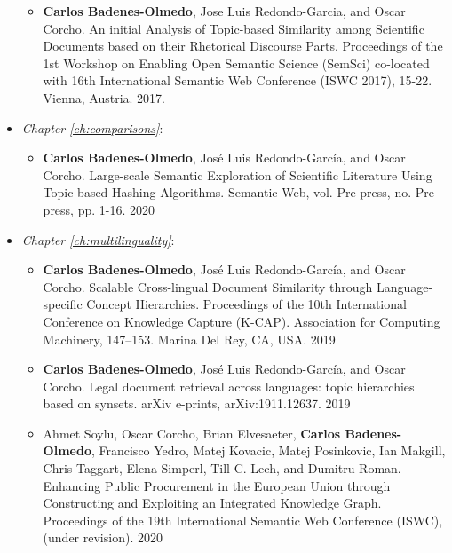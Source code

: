 \begin{itemize}
\begin{itemize}
\item \textbf{Carlos Badenes-Olmedo}, Jose Luis Redondo-Garcia, and Oscar Corcho. An initial Analysis of Topic-based Similarity among Scientific Documents based on their Rhetorical Discourse Parts. Proceedings of the 1st Workshop on Enabling Open Semantic Science (SemSci) co-located with 16th International Semantic Web Conference (ISWC 2017), 15-22. Vienna, Austria. 2017.
\end{itemize}
\item \textit{Chapter \ref{ch:comparisons}}:
\begin{itemize}
\item \textbf{Carlos Badenes-Olmedo}, José Luis Redondo-García, and Oscar Corcho. Large-scale Semantic Exploration of Scientific Literature Using Topic-based Hashing Algorithms. Semantic Web, vol. Pre-press, no. Pre-press, pp. 1-16. 2020
\end{itemize}
\item \textit{Chapter \ref{ch:multilinguality}}:
\begin{itemize}
\item \textbf{Carlos Badenes-Olmedo}, José Luis Redondo-García, and Oscar Corcho. Scalable Cross-lingual Document Similarity through Language-specific Concept Hierarchies. Proceedings of the 10th International Conference on Knowledge Capture (K-CAP). Association for Computing Machinery, 147–153. Marina Del Rey, CA, USA. 2019
\item \textbf{Carlos Badenes-Olmedo}, José Luis Redondo-García, and Oscar Corcho. Legal document retrieval across languages: topic hierarchies based on synsets. arXiv e-prints, arXiv:1911.12637. 2019
\item Ahmet Soylu, Oscar Corcho, Brian Elvesaeter, \textbf{Carlos Badenes-Olmedo}, Francisco Yedro, Matej Kovacic, Matej Posinkovic, Ian Makgill, Chris Taggart, Elena Simperl, Till C. Lech, and Dumitru Roman. Enhancing Public Procurement in the European Union through Constructing and Exploiting an Integrated Knowledge Graph. Proceedings of the 19th International Semantic Web Conference (ISWC), (under revision). 2020
\end{itemize}
\end{itemize}


